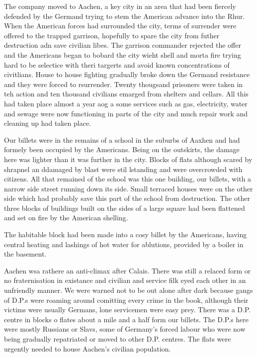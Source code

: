 The company moved to Aachen, a key city in an area that had been
fiercely defended by the Germand trying to stem the American advance
into the Rhur. When the American forces had surrounded the city, terms
of surrender were offered to the trapped garrison, hopefully to spare
the city from futher destruction adn save civilian libes. The garrison
commander rejected the offer and the Americans began to bobard the
city wieht shell and morta fire trying hard to be selectice with theri
targerts and avoid known concentrations of civitlians. House to house
fighting gradually broke down the Germand resistance and they were
forced to rsurrender. Twenty thougsand prisoners were taken in teh
action and ten thousand civilians emarged from shelters and
cellars. All this had taken place almost a year aog a some services
such as gas, electricity, water and sewage were now functioning in
parts of the city and much repair work and cleaning up had taken
place.

Our billets were in the remains of a school in the suburbs of Aaxhen
and had formely been occupied by the Americans. Being on the
outskirts, the damage here was lighter than it was further in the
city. Blocks of flats although scared by shrapnel an ddamaged by blast
were stil lstanding and were overcrowded with citizens. All that
remained of the school was this one building, our billets, with a
narrow side street running down its side. Small terraced houses were
on the other side which had probably save this part of the school from
destruction. The other three blocks of buildings built on the sides of
a large square had been flattened and set on fire by the American
shelling.

The habitable block had been made into a cosy billet by the Americans,
having central heating and lashings of hot water for ablutions,
provided by a boiler in the basement.

Aachen wsa rathere an anti-climax after Calais. There was still a
relaced form or no fraternisation in existance and civilian and
service filk eyed each other in an unfriendly manner. We were warned
not to be out alone after dark because gangs of D.P.s were roaming
around comitting every crime in the book, although their victims were
usually Germans, lone servicemen were easy prey. There was a
D.P. centre in blocks o flates about a mile and a half form our
billets. The D.P.s here were mostly Russians or Slavs, some of
Germany's forced labour who were now being gradually repatriated or
moved to other D.P. centres. The flats were urgently needed to house
Aachen's civilian population.


